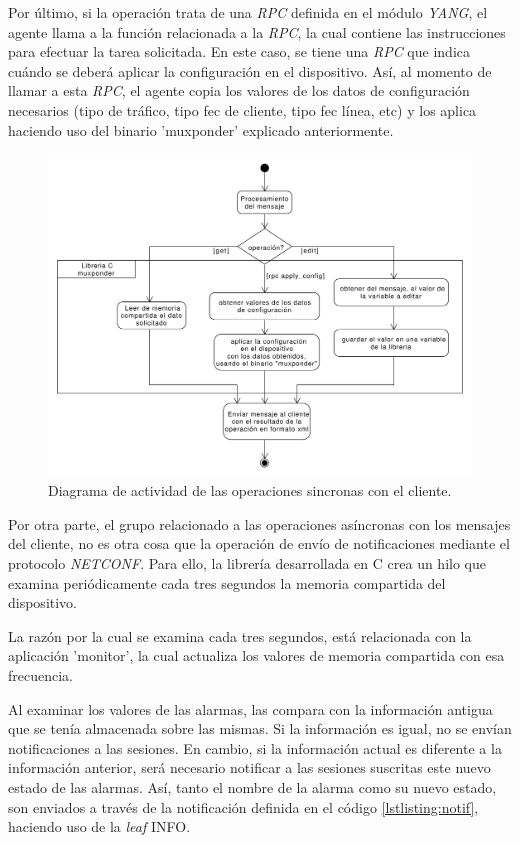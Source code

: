   Por último, si la operación trata de una \textit{RPC} definida en el módulo \textit{YANG}, el agente llama a la función relacionada a la \textit{RPC}, la cual contiene las instrucciones para efectuar la tarea solicitada. En este caso, se tiene una \textit{RPC} que indica cuándo se deberá aplicar la configuración en el dispositivo. Así, al momento de llamar a esta \textit{RPC}, el agente copia los valores de los datos de configuración necesarios (tipo de tráfico, tipo fec de cliente, tipo fec línea, etc) y los aplica haciendo uso del binario 'muxponder' explicado anteriormente.

  \begin{figure}[H]
    \centering
    \includegraphics[scale=0.45]{Figures/actividad_modulo_sinc.pdf}
    \caption{Diagrama de actividad de las operaciones sincronas con el cliente.}
    \label{fig:actividad_modulo_sinc}
  \end{figure}

  Por otra parte, el grupo relacionado a las operaciones asíncronas con los mensajes del cliente, no es otra cosa que la operación de envío de notificaciones mediante el protocolo \textit{NETCONF}. Para ello, la librería desarrollada en C crea un hilo que examina periódicamente cada tres segundos la memoria compartida del dispositivo. 
  
  La razón por la cual se examina cada tres segundos, está relacionada con la aplicación 'monitor', la cual actualiza los valores de memoria compartida con esa frecuencia.

  Al examinar los valores de las alarmas, las compara con la información antigua que se tenía almacenada sobre las mismas. Si la información es igual, no se envían notificaciones a las sesiones. En cambio, si la información actual es diferente a la información anterior, será necesario notificar a las sesiones suscritas este nuevo estado de las alarmas. Así, tanto el nombre de la alarma como su nuevo estado, son enviados a través de la notificación definida en el código \ref{lstlisting:notif}, haciendo uso de la \textit{leaf} INFO.
  

